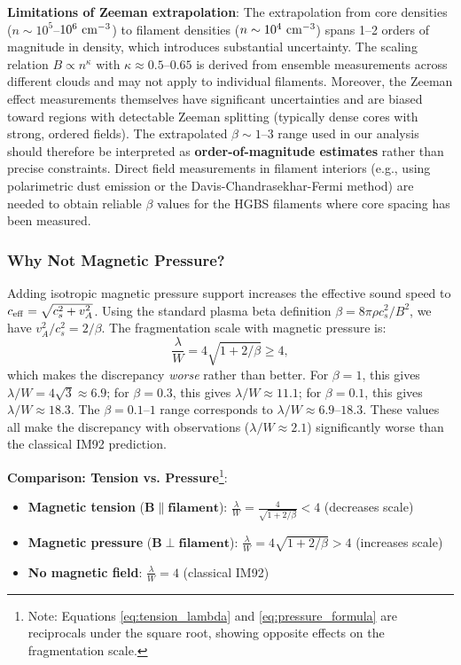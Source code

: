 \documentclass[11pt,a4paper]{article}
\begin{document}
\textbf{Limitations of Zeeman extrapolation}: The extrapolation from core densities ($n \sim 10^5$--$10^6~{\rm cm}^{-3}$) to filament densities ($n \sim 10^4~{\rm cm}^{-3}$) spans 1--2 orders of magnitude in density, which introduces substantial uncertainty. The scaling relation $B \propto n^{\kappa}$ with $\kappa \approx 0.5$--$0.65$ is derived from ensemble measurements across different clouds and may not apply to individual filaments. Moreover, the Zeeman effect measurements themselves have significant uncertainties and are biased toward regions with detectable Zeeman splitting (typically dense cores with strong, ordered fields). The extrapolated $\beta \sim 1$--$3$ range used in our analysis should therefore be interpreted as \textbf{order-of-magnitude estimates} rather than precise constraints. Direct field measurements in filament interiors (e.g., using polarimetric dust emission or the Davis-Chandrasekhar-Fermi method) are needed to obtain reliable $\beta$ values for the HGBS filaments where core spacing has been measured.

\subsubsection{Why Not Magnetic Pressure?}

Adding isotropic magnetic pressure support increases the effective sound speed to $c_{\rm eff} = \sqrt{c_s^2 + v_A^2}$. Using the standard plasma beta definition $\beta = 8\pi\rho c_s^2/B^2$, we have $v_A^2/c_s^2 = 2/\beta$. The fragmentation scale with magnetic pressure is:
\begin{equation}
\frac{\lambda}{W} = 4\sqrt{1 + 2/\beta} \geq 4,
\label{eq:pressure_formula}
\end{equation}
which makes the discrepancy \emph{worse} rather than better. For $\beta = 1$, this gives $\lambda/W = 4\sqrt{3} \approx 6.9$; for $\beta = 0.3$, this gives $\lambda/W \approx 11.1$; for $\beta = 0.1$, this gives $\lambda/W \approx 18.3$. The $\beta = 0.1$--$1$ range corresponds to $\lambda/W \approx 6.9$--$18.3$. These values all make the discrepancy with observations ($\lambda/W \approx 2.1$) significantly worse than the classical IM92 prediction.

\textbf{Comparison: Tension vs. Pressure}\footnote{Note: Equations \ref{eq:tension_lambda} and \ref{eq:pressure_formula} are reciprocals under the square root, showing opposite effects on the fragmentation scale.}:
\begin{itemize}
    \item \textbf{Magnetic tension} ($\mathbf{B \parallel \text{filament}}$): $\displaystyle\frac{\lambda}{W} = \frac{4}{\sqrt{1 + 2/\beta}} < 4$ (decreases scale)
    \item \textbf{Magnetic pressure} ($\mathbf{B \perp \text{filament}}$): $\displaystyle\frac{\lambda}{W} = 4\sqrt{1 + 2/\beta} > 4$ (increases scale)
    \item \textbf{No magnetic field}: $\displaystyle\frac{\lambda}{W} = 4$ (classical IM92)
\end{itemize}
\end{document}
